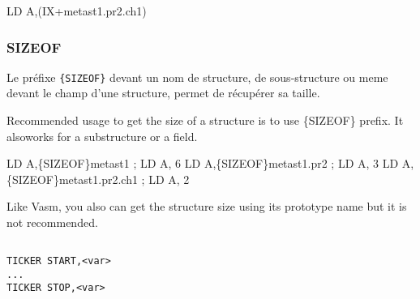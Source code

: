 \begin{code}
LD A,(IX+metast1.pr2.ch1)
\end{code}


\subsubsection{SIZEOF}

\begin{xfr}
  Le préfixe \texttt{\{SIZEOF\}} devant un nom de structure, de sous-structure ou meme devant le champ d'une structure, permet de récupérer sa taille.
\end{xfr}

\begin{xen}
Recommended usage to get the size of a structure is to use \{SIZEOF\} prefix.
It alsoworks for a substructure or a field.
\end{xen}

\begin{code}
  LD A,\{SIZEOF\}metast1              ; LD A, 6
  LD A,\{SIZEOF\}metast1.pr2          ; LD A, 3
  LD A,\{SIZEOF\}metast1.pr2.ch1      ; LD A, 2
\end{code}


\begin{xen}
Like Vasm, you also can get the structure size using its prototype name but it is not recommended.
\end{xen}


\subsection{}

\begin{verbatim}
TICKER START,<var>
...
TICKER STOP,<var>
\end{verbatim}

